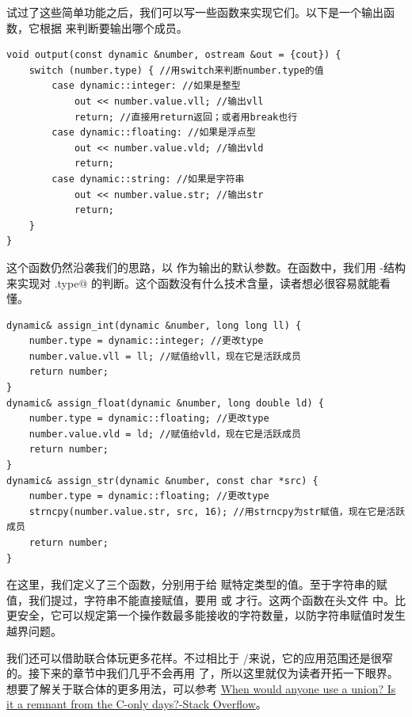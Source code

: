 试过了这些简单功能之后，我们可以写一些函数来实现它们。以下是一个输出函数，它根据 \lstinline@type@ 来判断要输出哪个成员。
\begin{lstlisting}
void output(const dynamic &number, ostream &out = {cout}) {
    switch (number.type) { //用switch来判断number.type的值
        case dynamic::integer: //如果是整型
            out << number.value.vll; //输出vll
            return; //直接用return返回；或者用break也行
        case dynamic::floating: //如果是浮点型
            out << number.value.vld; //输出vld
            return;
        case dynamic::string: //如果是字符串
            out << number.value.str; //输出str
            return;
    }
}
\end{lstlisting}
这个函数仍然沿袭我们的思路，以 \lstinline@cout@ 作为输出的默认参数。在函数中，我们用 \lstinline@switch@-\lstinline@case@ 结构来实现对 \lstinline@number.type@ 的判断。这个函数没有什么技术含量，读者想必很容易就能看懂。\par
\begin{lstlisting}
dynamic& assign_int(dynamic &number, long long ll) {
    number.type = dynamic::integer; //更改type
    number.value.vll = ll; //赋值给vll，现在它是活跃成员
    return number;
}
dynamic& assign_float(dynamic &number, long double ld) {
    number.type = dynamic::floating; //更改type
    number.value.vld = ld; //赋值给vld，现在它是活跃成员
    return number;
}
dynamic& assign_str(dynamic &number, const char *src) {
    number.type = dynamic::floating; //更改type
    strncpy(number.value.str, src, 16); //用strncpy为str赋值，现在它是活跃成员
    return number;
}
\end{lstlisting}
在这里，我们定义了三个函数，分别用于给 \lstinline@number@ 赋特定类型的值。至于字符串的赋值，我们提过，字符串不能直接赋值，要用 \lstinline@strcpy@ 或 \lstinline@strncpy@ 才行。这两个函数在头文件 \lstinline@cstring@ 中。\lstinline@strncpy@ 比 \lstinline@strcpy@ 更安全，它可以规定第一个操作数最多能接收的字符数量，以防字符串赋值时发生越界问题。\par
我们还可以借助联合体玩更多花样。不过相比于 \lstinline@class@/\lstinline@struct@ 来说，它的应用范围还是很窄的。接下来的章节中我们几乎不会再用 \lstinline@union@ 了，所以这里就仅为读者开拓一下眼界。想要了解关于联合体的更多用法，可以参考 \href{https://stackoverflow.com/questions/4788965/when-would-anyone-use-a-union-is-it-a-remnant-from-the-c-only-days}{When would anyone use a union? Is it a remnant from the C-only days?-Stack Overflow}。\par
